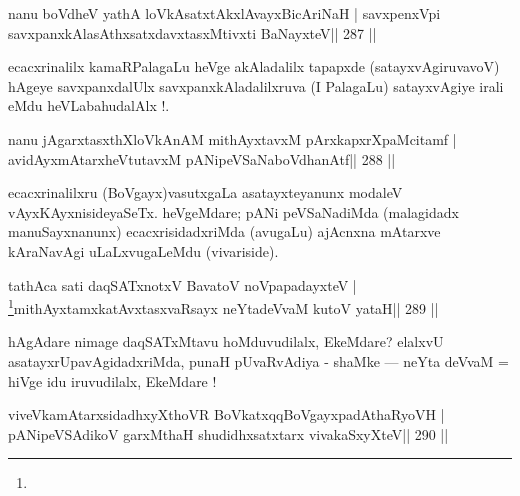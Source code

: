 
\begin{shl}
nanu boVdheV yathA loVkAsatxtAkxlAvayxBicAriNaH |
savxpenxV\s pi savxpanxkAlasAthxsatxdavxtasxMtivxti BaNayxteV\hfill || 287 ||
\end{shl}

\begin{artha}
ecacxrinalilx kamaRPalagaLu heVge akAladalilx tapapxde (satayxvAgiruvavoV) hAgeye savxpanxdalUlx savxpanxkAladalilxruva (I PalagaLu) satayxvAgiye irali eMdu heVLabahudalAlx !.
\end{artha}


\begin{shl}
nanu jAgarxtasxthXloVkAnAM mithAyxtavxM pArxkapxrXpaMcitamf |
avidAyxmAtarxheVtutavxM pANipeVSaNaboVdhanAtf\hfill || 288 ||
\end{shl}

\begin{artha}
ecacxrinalilxru (BoVgayx)vasutxgaLa asatayxteyanunx modaleV  vAyxKAyxnisideyaSeTx. heVgeMdare; pANi peVSaNadiMda (malagidadx  manuSayxnanunx) ecacxrisidadxriMda (avugaLu) ajAcnxna mAtarxve kAraNavAgi uLaLxvugaLeMdu (vivariside).
\end{artha}

\begin{shl}
tathAca sati daqSATxnotxV BavatoV noVpapadayxteV |
\footnote[1]{}mithAyxtamxkatAvxtasxvaRsayx neYtadeVvaM kutoV yataH\hfill || 289 ||
\end{shl}

\begin{artha}
hAgAdare nimage daqSATxMtavu hoMduvudilalx, EkeMdare? elalxvU asatayxrUpavAgidadxriMda, punaH pUvaRvAdiya - shaMke  {\rm ---}  neYta deVvaM = hiVge idu iruvudilalx, EkeMdare !
\end{artha}

\begin{shl}
\footnotemark[2]viveVkamAtarxsidadhxyXthoVR BoVkatxqqBoVgayxpadAthaRyoVH |
pANipeVSAdikoV garxMthaH shudidhxsatxtarx vivakaSxyXteV\hfill || 290 ||
\end{shl}

